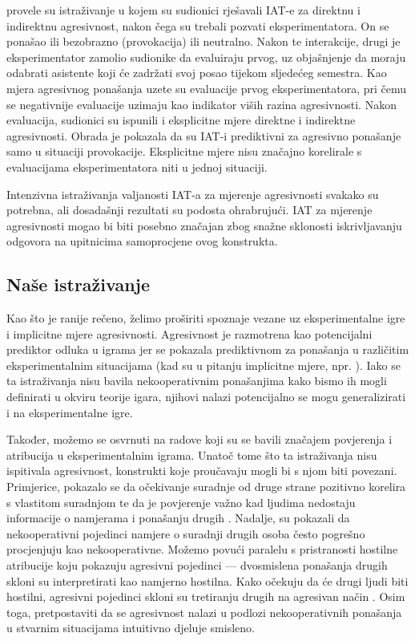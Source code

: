\documentclass[a4paper, 12pt]{report}
\begin{document}
\citet{richetin2010predictive} provele su istraživanje u kojem su sudionici
rješavali IAT-e za direktnu i indirektnu agresivnost, nakon čega su trebali
pozvati eksperimentatora. On se ponašao ili bezobrazno (provokacija) ili
neutralno. Nakon te interakcije, drugi je eksperimentator zamolio sudionike da
evaluiraju prvog, uz objašnjenje da moraju odabrati asistente koji će zadržati
svoj posao tijekom sljedećeg semestra. Kao mjera agresivnog ponašanja uzete su evaluacije
prvog eksperimentatora, pri čemu se negativnije evaluacije uzimaju kao indikator
viših razina agresivnosti. Nakon evaluacija, sudionici su ispunili i
eksplicitne mjere direktne i indirektne agresivnosti. Obrada je pokazala da su
IAT-i prediktivni za agresivno ponašanje samo u situaciji provokacije.
Eksplicitne mjere nisu značajno korelirale s evaluacijama eksperimentatora niti
u jednoj situaciji.

Intenzivna istraživanja valjanosti IAT-a za mjerenje agresivnosti svakako su
potrebna, ali dosadašnji rezultati su podosta ohrabrujući. IAT za mjerenje
agresivnosti mogao bi biti posebno značajan zbog snažne sklonosti iskrivljavanju
odgovora na upitnicima samoprocjene ovog konstrukta. 

\subsection{Naše istraživanje}

Kao što je ranije rečeno, želimo proširiti spoznaje vezane uz eksperimentalne
igre i implicitne mjere agresivnosti.
Agresivnost je razmotrena kao potencijalni prediktor odluka u 
igrama  jer se pokazala
prediktivnom za ponašanja u različitim eksperimentalnim situacijama
(kad su u pitanju implicitne mjere, npr. 
\citealp{richetin2010predictive, banse2015predicting}). 
Iako se ta istraživanja nisu bavila nekooperativnim ponašanjima kako bismo ih
mogli definirati u okviru teorije igara, njihovi nalazi potencijalno se mogu
generalizirati i na eksperimentalne igre.

Također,  možemo se osvrnuti na radove koji su se
bavili značajem povjerenja i atribucija u eksperimentalnim igrama.
Unatoč tome što ta istraživanja nisu ispitivala agresivnost, konstrukti koje proučavaju mogli
bi s njom biti povezani.
Primjerice, pokazalo se da očekivanje suradnje od druge strane pozitivno korelira s vlastitom
suradnjom te da je povjerenje važno kad ljudima nedostaju informacije o
namjerama i ponašanju drugih \citep{balliet2013trust, vancoop}. Nadalje,
\citet{kelley1970inference} su pokazali da nekooperativni pojedinci namjere o
suradnji drugih osoba često pogrešno procjenjuju kao nekooperativne.
Možemo povući paralelu s pristranosti hostilne atribucije koju pokazuju agresivni
pojedinci --- dvosmislena ponašanja drugih skloni su interpretirati kao namjerno
hostilna. Kako očekuju da će drugi ljudi biti hostilni, agresivni pojedinci
skloni su tretiranju drugih na agresivan način \citep{larsbuss}. 
Osim toga, pretpostaviti da se agresivnost nalazi u podlozi nekooperativnih
ponašanja u stvarnim situacijama intuitivno djeluje smisleno.
\end{document}
